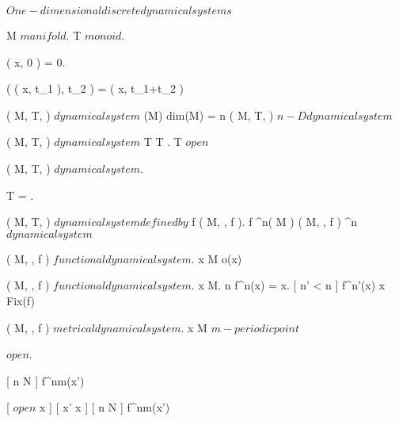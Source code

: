 \documentclass[../Main/main]{subfiles}
\begin{document}
\unit{ $ One-dimensional discrete dynamical systems $ }
{	
	
	
	{
		{
			M $ manifold $.
			T $ monoid $.

		}
		{
			{
				\phi( x, 0 ) = 0.

				{
					\phi( \phi( x, t_1 ), t_2 ) = \phi( x, t_1+t_2 )
				}
			}
		}

	}
	{
		{
			( M, T, \phi ) $ dynamical system $
		}
		{
			\dim(M)
		}
		\denote
		{
			dim(M) = n \as ( M, T, \phi ) $ n-D dynamical system $
		}
	}


	{
		{
			( M, T, \phi ) $ dynamical system $
		}
		{
			T \countable
		}
		{
			T \subset \R.
			T $ open $
		}
	}


	{
		{
			( M, T, \phi ) $ dynamical system $.
		}
		{
			T = \N.

		}
		\denote
		{
			( M, T, \phi ) $ dynamical system defined by $ f \as ( M, \N, f ).
			f \in \Cc^n( M ) \as ( M, \N, f ) \hspace{5pt} \Cc^n $ dynamical system $
		}
	}
	
	
	{
		{
			( M, \N, f ) $ functional dynamical system $.
			x \in M
		}
		{
		}
		\denote
		{
			o(x)
		}
	}
	
	
	{
		{
			( M, \N, f ) $ functional dynamical system $.
			x \in M.
			n \in \N
		}
		{
			f^n(x) = x.
			[ n' < n ]
			{
				f^{n'}(x) \neq x
			}
		}
		\denote
		{
			 \as Fix(f)
		}
	}
	

	{
		{
			( M, \N, f ) $ metrical dynamical system $.
			x \in M $ m-periodic point $
		}
		{
			{
				\Uc $ open $.

				{
					{
						[ n \geq N ]
						{
							f^{nm}(x') \in \Uc
						}
					}
				}
			}
		}
		{
			[ \Uc $ open $ \logicAnd x \in \Uc ]
			{
				[ x' \neq x ]
				{
					{
						[ n \geq N ]
						{
							f^{nm}(x') \nin \Uc
						}
					}
				}
			}
		}
	}
	
}
\end{document}
